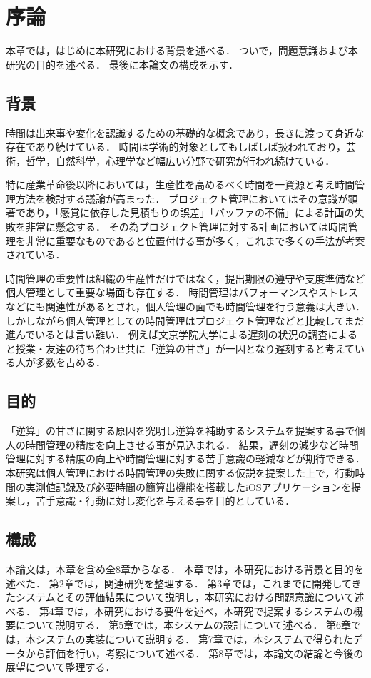 \chapter{序論}
本章では，はじめに本研究における背景を述べる．
ついで，問題意識および本研究の目的を述べる．
最後に本論文の構成を示す．

\section{背景}
時間は出来事や変化を認識するための基礎的な概念であり，長きに渡って身近な存在であり続けている\cite{history}．
時間は学術的対象としてもしばしば扱われており，芸術，哲学，自然科学，心理学など幅広い分野で研究が行われ続けている．

特に産業革命後以降においては，生産性を高めるべく時間を一資源と考え時間管理方法を検討する議論が高まった\cite{Taylor1911}．
プロジェクト管理においてはその意識が顕著であり，「感覚に依存した見積もりの誤差」「バッファの不備」による計画の失敗を非常に懸念する\cite{innopm}．
その為プロジェクト管理に対する計画においては時間管理を非常に重要なものであると位置付ける事が多く，これまで多くの手法が考案されている\cite{EORMS}．

時間管理の重要性は組織の生産性だけではなく，提出期限の遵守や支度準備など個人管理として重要な場面も存在する．
時間管理はパフォーマンス\cite{Barling1996}\cite{Britton1991}\cite{Trueman1996}やストレス\cite{Macan1994}などにも関連性があるとされ，個人管理の面でも時間管理を行う意義は大きい\cite{Claessens2007}．
しかしながら個人管理としての時間管理はプロジェクト管理などと比較してまだ進んでいるとは言い難い．
例えば文京学院大学による遅刻の状況の調査によると授業・友達の待ち合わせ共に「逆算の甘さ」が一因となり遅刻すると考えている人が多数を占める\cite{bunkyo}．

\section{目的}
「逆算」の甘さに関する原因を究明し逆算を補助するシステムを提案する事で個人の時間管理の精度を向上させる事が見込まれる．
結果，遅刻の減少など時間管理に対する精度の向上や時間管理に対する苦手意識の軽減などが期待できる．
本研究は個人管理における時間管理の失敗に関する仮説を提案した上で，行動時間の実測値記録及び必要時間の簡算出機能を搭載したiOSアプリケーションを提案し，苦手意識・行動に対し変化を与える事を目的としている．

\section{構成}
本論文は，本章を含め全8章からなる．
本章では，本研究における背景と目的を述べた．
第2章では，関連研究を整理する．
第3章では，これまでに開発してきたシステムとその評価結果について説明し，本研究における問題意識について述べる．
第4章では，本研究における要件を述べ，本研究で提案するシステムの概要について説明する．
第5章では，本システムの設計について述べる．
第6章では，本システムの実装について説明する．
第7章では，本システムで得られたデータから評価を行い，考察について述べる．
第8章では，本論文の結論と今後の展望について整理する．